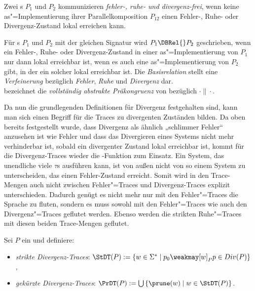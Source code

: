 \begin{Def}
  Zwei \MEIO{}s $P_1$ und $P_2$ kommunizieren \emph{fehler-, ruhe- und
  divergenz-frei}, wenn keine as"=Implementierung ihrer Parallelkomposition
  $P_{12}$ einen Fehler-, Ruhe- oder Divergenz-Zustand lokal erreichen kann.
\end{Def}

\begin{Def}
  Für \MEIO{}s $P_1$ und $P_2$ mit der gleichen Signatur wird $P_1\DBRel{} P_2$
  geschrieben, wenn ein Fehler-, Ruhe- oder Divergenz-Zustand in einer
  as"=Implementierung von $P_1$ nur dann lokal erreichbar ist, wenn es auch
  eine as"=Implementierung von $P_2$ gibt, in der ein solcher lokal erreichbar
  ist. Die \emph{Basisrelation} stellt eine \emph{Verfeinerung} bezüglich
  \emph{Fehler}, \emph{Ruhe} und \emph{Divergenz} dar.\\
  \DCRel{} bezeichnet die \emph{vollständig abstrakte Präkongruenz} von
  \DBRel{} bezüglich $\cdot\|\cdot$.
\end{Def}

Da nun die grundlegenden Definitionen für Divergenz festgehalten sind, kann man
sich einen Begriff für die Traces zu divergenten Zuständen bilden. Da oben
bereits festgestellt wurde, dass Divergenz als ähnlich „schlimmer Fehler“
anzusehen ist wie Fehler und dass das Divergieren eines Systems
nicht mehr verhinderbar ist, sobald ein divergenter Zustand lokal erreichbar
ist, kommt für die Divergenz-Traces wieder die \prune{}-Funktion zum Einsatz. Ein
System, das unendliche viele $\tau$s ausführen kann, ist von außen nicht von so
einem System zu unterscheiden, das einen Fehler-Zustand erreicht. Somit wird in
den Trace-Mengen auch nicht zwischen Fehler"=Traces und Divergenz-Traces
explizit unterschieden. Dadurch genügt es nicht mehr nur mit den
Fehler"=Traces die Sprache zu fluten, sondern es muss sowohl mit den
Fehler"=Traces wie auch den Divergenz"=Traces geflutet werden.
Ebenso werden die strikten Ruhe"=Traces mit diesen beiden Trace-Mengen
geflutet.

\begin{Def}
  Sei $P$ ein \MEIO{} und definiere:
  \begin{itemize}
    \item \emph{strikte Divergenz-Traces}: $\StDT (P) := \left\{w\in\Sigma
      ^*\mid p_0\weakmay[w]_P p\in Div(P)\right\}$,
    \item \emph{gekürzte Divergenz-Traces}: $\PrDT (P) := \bigcup\left\{\prune
      (w)\mid w\in\StDT (P)\right\}$.
  \end{itemize}
\end{Def}

